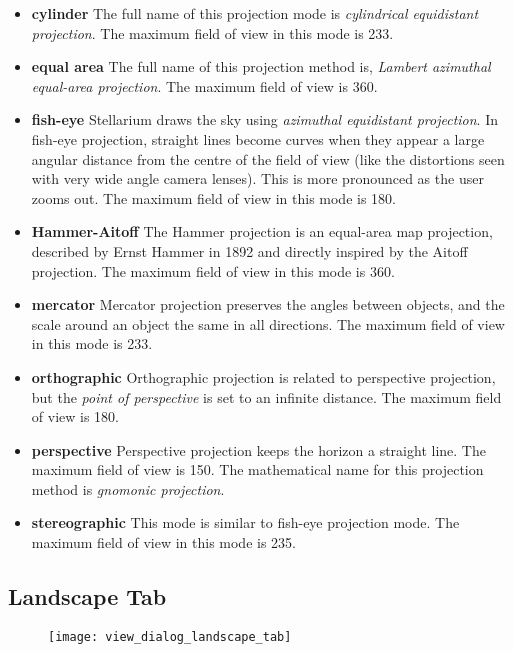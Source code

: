 \begin{itemize}
  \begin{itemize}
  \item
    \textbf{cylinder} The full name of this projection mode is
    \emph{cylindrical equidistant projection}. The maximum field of view
    in this mode is 233\degree.
  \item
    \textbf{equal area} The full name of this projection method is,
    \emph{Lambert azimuthal equal-area projection}. The maximum field of
    view is 360\degree.
  \item
    \textbf{fish-eye} Stellarium draws the sky using \emph{azimuthal
    equidistant projection}. In fish-eye projection, straight lines
    become curves when they appear a large angular distance from the
    centre of the field of view (like the distortions seen with very
    wide angle camera lenses). This is more pronounced as the user zooms
    out. The maximum field of view in this mode is 180\degree.
  \item
    \textbf{Hammer-Aitoff} The Hammer projection is an equal-area map
    projection, described by Ernst Hammer in 1892 and directly inspired
    by the Aitoff projection. The maximum field of view in this mode is
    360\degree.
  \item
    \textbf{mercator} Mercator projection preserves the angles between
    objects, and the scale around an object the same in all directions.
    The maximum field of view in this mode is 233\degree.
  \item
    \textbf{orthographic} Orthographic projection is related to
    perspective projection, but the \emph{point of perspective} is set
    to an infinite distance. The maximum field of view is 180\degree.
  \item
    \textbf{perspective} Perspective projection keeps the horizon a
    straight line. The maximum field of view is 150\degree. The mathematical
    name for this projection method is \emph{gnomonic projection}.
  \item
    \textbf{stereographic} This mode is similar to fish-eye projection
    mode. The maximum field of view in this mode is 235\degree.
  \end{itemize}
\end{itemize}

\subsection{Landscape Tab}\label{landscape-tab}

\begin{figure}[h]
\centering\texttt{[image: view\_dialog\_landscape\_tab]}
\end{figure}

